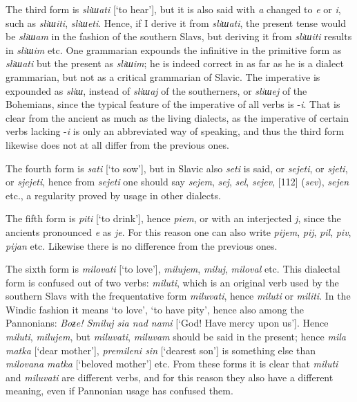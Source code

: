 The third form is \textit{sliшati} [‘to hear’], but it is also said with \textit{a} changed to \textit{e} or \textit{i}, such as \textit{sliшiti}, \textit{sliшeti}. Hence, if I derive it from \textit{sliшati}, the present tense would be \textit{sliшam} in the fashion of the southern Slavs, but deriving it from \textit{sliшiti} results in \textit{sliшim} etc. One grammarian expounds the infinitive in the primitive form as \textit{sliшati} but the present as \textit{sliшim}; he is indeed correct in as far as he is a dialect grammarian, but not as a critical grammarian of Slavic. The imperative is expounded as \textit{sliш}, instead of \textit{sliшaj} of the southerners, or \textit{sliшej} of the Bohemians, since the typical feature of the imperative of all verbs is -\textit{i}. That is clear from the ancient as much as the living dialects, as the imperative of certain verbs lacking -\textit{i} is only an abbreviated way of speaking, and thus the third form likewise does not at all differ from the previous ones.

The fourth form is \textit{sati} [‘to sow’], but in Slavic also \textit{seti} is said, or \textit{sejeti}, or \textit{sjeti}, or \textit{sjejeti}, hence from \textit{sejeti} one should say \textit{sejem}, \textit{sej}, \textit{sel}, \textit{sejev}, [112] (\textit{sev}), \textit{sejen} etc., a regularity proved by usage in other dialects.

The fifth form is \textit{piti} [‘to drink’], hence \textit{piem}, or with an interjected \textit{j}, since the ancients pronounced \textit{e} as \textit{je}. For this reason one can also write \textit{pijem}, \textit{pij}, \textit{pil}, \textit{piv}, \textit{pijan} etc. Likewise there is no difference from the previous ones.

The sixth form is \textit{milovati} [‘to love’], \textit{milujem}, \textit{miluj}, \textit{miloval} etc. This dialectal form is confused out of two verbs: \textit{miluti}, which is an original verb used by the southern Slavs with the frequentative form \textit{miluvati}, hence \textit{miluti} or \textit{militi}. In the Windic fashion it means ‘to love’, ‘to have pity’, hence also among the Pannonians: \textit{Boƶe! Smiluj sia nad nami} [‘God! Have mercy upon us’]. Hence \textit{miluti}, \textit{milujem}, but \textit{miluvati}, \textit{miluvam} should be said in the present; hence \textit{mila matka} [‘dear mother’], \textit{premileni sin} [‘dearest son’] is something else than \textit{milovana matka} [‘beloved mother’] etc. From these forms it is clear that \textit{miluti} and \textit{miluvati} are different verbs, and for this reason they also have a different meaning, even if Pannonian usage has confused them.

